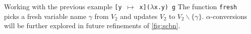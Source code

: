 \documentclass[11pt,oneside,a4paper]{report}
\begin{document}
Working with the previous example \texttt{[y $\mapsto$ x]($\lambda$x.y) g}
The function \texttt{fresh} picks a fresh variable name $\gamma$ from $V_2$ and updates $V_2$ to $V_2 \backslash \{\gamma\}$.
$\alpha$-conversions will be further explored in future refinements of \autoref{fig:scbn}.
\\

\end{document}
